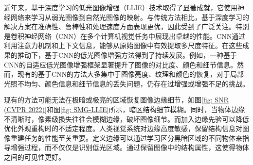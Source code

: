\documentclass[a4paper]{ctexart}
\begin{document}
	近年来，基于深度学习的低光图像增强（LLIE）技术取得了显著成就，它使用神经网络来学习从弱光图像到自然光图像的映射。与传统方法相比，基于深度学习的解决方案在准确性、鲁棒性和处理速度方面表现更优，因此受到了广泛关注。特别是卷积神经网络（CNN）在多个计算机视觉任务中展现出卓越的性能。CNN通过利用注意力机制和\cite{yang2021locally, zhang2020attention}上下文信息，能够从原始图像中有效提取多尺度特征\cite{li2018multi, zamir2020learning}。在这些成果的推动下，基于CNN的低光图像增强方法得到了持续发展。例如，一种基于CNN的自适应低光图像增强框架\cite{li2020visual}显著提升了图像的对比度、颜色和细节信息。然而，现有的基于CNN的方法大多集中于图像亮度、纹理和颜色的恢复，对于局部光照不均匀、颜色信息和细节信息的丢失问题，仍存在过增强或增强不足的挑战。
	
	现有的方法可能无法在极暗或极亮的区域恢复图像边缘细节\cite{xu2023low}，如图\ref{fig: SNR (CVPR 2022)}和图\ref{fig: SMG-LLIE}所示，暗区结构细节模糊。同时，当物体边缘不清晰时，像素级损失往往会模糊边缘，破坏图像细节。而加入边缘先验可以降低优化外观重构时的不适定程度。人类视觉系统对边缘高度敏感，保留结构信息对图像重建任务的性能至关重要。定义边缘可以通过学习区分黑暗区域的不同物体来指导增强过程，而不仅仅是识别低光区域。通过保留图像中的结构属性，这使得物体之间的可见性更好。
	
\end{document}
